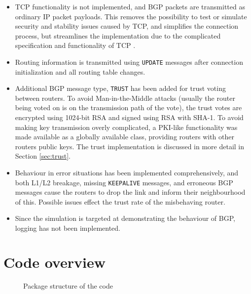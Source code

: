\documentclass[11pt,a4paper,titlepage]{report}
\begin{document}
\begin{itemize}
\item TCP functionality is not implemented, and BGP packets are transmitted as ordinary IP packet payloads. This removes the possibility to test or simulate security and stability issues caused by TCP, and simplifies the connection process, but streamlines the implementation due to the complicated specification and functionality of TCP \cite{RFC0793}.
\item Routing information is transmitted using \texttt{UPDATE} messages after connection initialization and all routing table changes.
\item Additional BGP message type, \texttt{TRUST} has been added for trust voting between routers. To avoid Man-in-the-Middle attacks (usually the router being voted on is on the transmission path of the vote), the trust votes are encrypted using 1024-bit RSA and signed using RSA with SHA-1. To avoid making key transmission overly complicated, a PKI-like functionality was made available as a globally available class, providing routers with other routers public keys. The trust implementation is discussed in more detail in Section \ref{sec:trust}.
\item Behaviour in error situations has been implemented comprehensively, and both L1/L2 breakage, missing \texttt{KEEPALIVE} messages, and erroneous BGP messages cause the routers to drop the link and inform their neighbourhood of this. Possible issues effect the trust rate of the misbehaving router.
\item Since the simulation is targeted at demonstrating the behaviour of BGP, logging has not been implemented.
\end{itemize}

\section{Code overview}\label{sec:hlo}

\begin{figure}
\caption{Package structure of the code}
\label{fig:packagestructure}
\end{figure}
\end{document}
